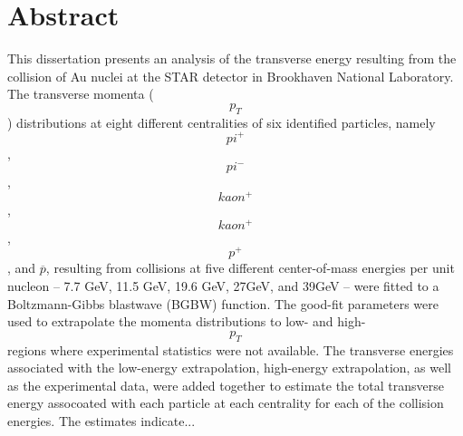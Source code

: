 \chapter*{Abstract}\label{ch:abstract}

This dissertation presents an analysis of the transverse energy resulting from the collision of Au nuclei at the STAR detector in Brookhaven National Laboratory. The transverse momenta (\[p_T\]) distributions at eight different centralities of six identified particles, namely \[pi^+\], \[pi^-\], \[kaon^+\], \[kaon^+\], \[p^+\], and $\overbar{p}$, resulting from collisions at five different center-of-mass energies per unit nucleon -- 7.7 GeV, 11.5 GeV, 19.6 GeV, 27GeV, and 39GeV -- were fitted to a Boltzmann-Gibbs blastwave (BGBW) function. The good-fit parameters were used to extrapolate the momenta distributions to low- and high-\[p_T\] regions where experimental statistics were not available. The transverse energies associated with the low-energy extrapolation, high-energy extrapolation, as well as the experimental data, were added together to estimate the total transverse energy assocoated with each particle at each centrality for each of the collision energies. The estimates indicate...
